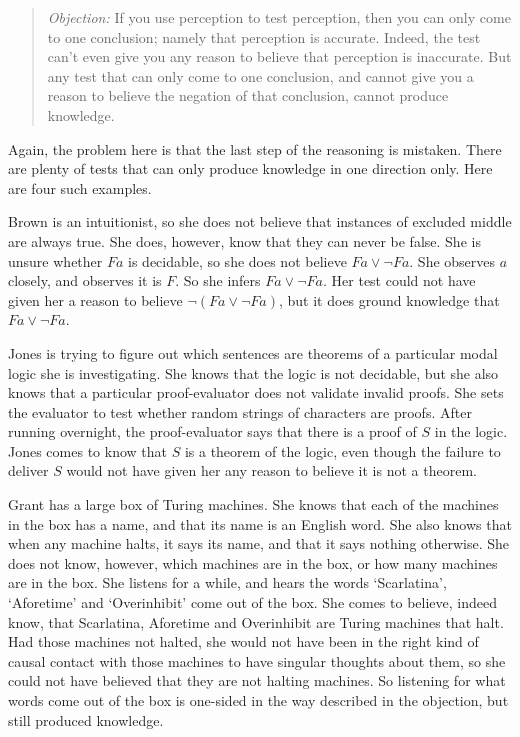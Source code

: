 \begin{quote}\textit{Objection:}
If you use perception to test perception, then you can only come to one conclusion; namely that perception is accurate. Indeed, the test can't even give you any reason to believe that perception is inaccurate. But any test that can only come to one conclusion, and cannot give you a reason to believe the negation of that conclusion, cannot produce knowledge.
\end{quote}

\noindent Again, the problem here is that the last step of the reasoning is mistaken. There are plenty of tests that can only produce knowledge in one direction only. Here are four such examples.

Brown is an intuitionist, so she does not believe that instances of excluded middle are always true. She does, however, know that they can never be false. She is unsure whether \(Fa\) is decidable, so she does not believe \(Fa \vee \neg Fa\). She observes \(a\) closely, and observes it is \(F\). So she infers \(Fa \vee \neg Fa\). Her test could not have given her a reason to believe \(\neg(Fa \vee \neg Fa)\), but it does ground knowledge that \(Fa \vee \neg Fa\).

Jones is trying to figure out which sentences are theorems of a particular modal logic she is investigating. She knows that the logic is not decidable, but she also knows that a particular proof-evaluator does not validate invalid proofs. She sets the evaluator to test whether random strings of characters are proofs. After running overnight, the proof-evaluator says that there is a proof of \(S\) in the logic. Jones comes to know that \(S\) is a theorem of the logic, even though the failure to deliver \(S\) would not have given her any reason to believe it is not a theorem.

Grant has a large box of Turing machines. She knows that each of the machines in the box has a name, and that its name is an English word. She also knows that when any machine halts, it says its name, and that it says nothing otherwise. She does not know, however, which machines are in the box, or how many machines are in the box. She listens for a while, and hears the words `Scarlatina', `Aforetime' and `Overinhibit' come out of the box. She comes to believe, indeed know, that Scarlatina, Aforetime and Overinhibit are Turing machines that halt. Had those machines not halted, she would not have been in the right kind of causal contact with those machines to have singular thoughts about them, so she could not have believed that they are not halting machines. So listening for what words come out of the box is one-sided in the way described in the objection, but still produced knowledge.

